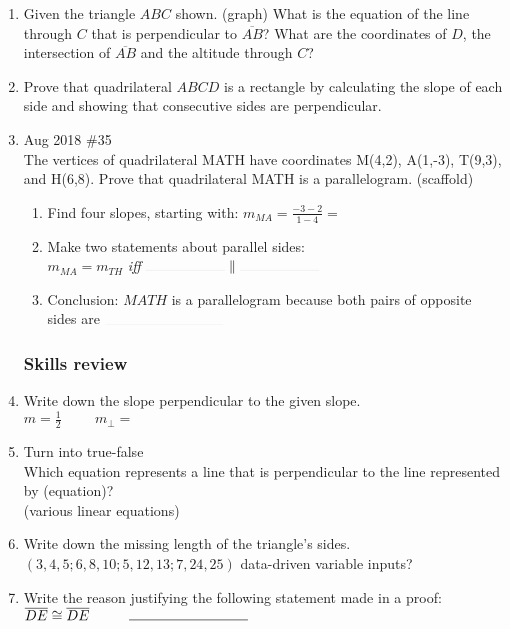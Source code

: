 \documentclass[12pt, twoside]{article}
\begin{document}
\begin{enumerate}
    \item Given the triangle $ABC$ shown. (graph) What is the equation of the line through $C$ that is perpendicular to $\overline{AB}$? What are the coordinates of $D$, the intersection of $\overline{AB}$ and the altitude through $C$?

    \item Prove that quadrilateral $ABCD$ is a rectangle by calculating the slope of each side and showing that consecutive sides are perpendicular.

    \item Aug 2018 \#35\\
    The vertices of quadrilateral MATH have coordinates M(4,2), A(1,-3), T(9,3), and H(6,8). Prove that quadrilateral MATH is a parallelogram.
    (scaffold)
      \begin{enumerate}
        \item Find four slopes, starting with: $\displaystyle m_{MA}=\frac{-3-2}{1-4}=$
        \item Make two statements about parallel sides:\\
        $ m_{MA} = m_{TH}$ \emph{iff} $\rule{2cm}{0.015mm} \parallel \rule{2cm}{0.015mm}$ %
        \item Conclusion: $MATH$ is a parallelogram because both pairs of opposite sides are $\rule{3cm}{0.015mm}$
    \end{enumerate}

\subsubsection*{Skills review}
  \item Write down the slope perpendicular to the given slope.\\
  $m=\frac{1}{2} \hspace{1cm} m_{\perp} = $

  \item Turn into true-false\\
  Which equation represents a line that is perpendicular to the line represented by (equation)?\\
  (various linear equations)

  \item Write down the missing length of the triangle’s sides.
  $(3,4,5; 6,8,10; 5,12,13; 7, 24, 25)$ data-driven variable inputs?

  \item Write the reason justifying the following statement made in a proof:\\[0.5cm]
  $\overline{DE} \cong \overline{DE} \hspace{1cm} \rule{3cm}{0.015cm}$


\end{enumerate}
\end{document}

